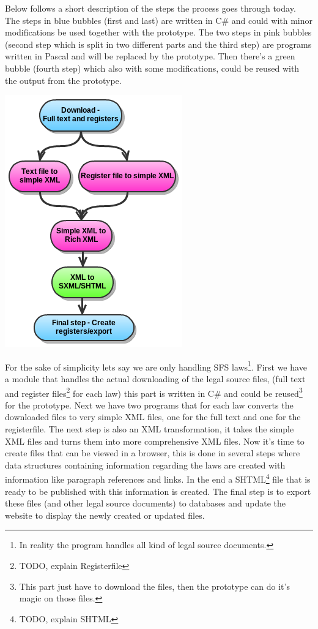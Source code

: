 \documentclass[a4paper,11pt]{kth-mag}
\begin{document}
Below follows a short description of the steps the process goes through today. The steps in blue bubbles (first and last) are written in C\# and could with minor modifications be used together with the prototype. The two steps in pink bubbles (second step which is split in two different parts and the third step) are programs written in Pascal and will be replaced by the prototype. Then there's a green bubble (fourth step) which also with some modifications, could be reused with the output from the prototype.   
\begin{center}
\includegraphics[scale=0.6]{imgs/oldSystemChart.png}
\end{center}
For the sake of simplicity lets say we are only handling SFS laws\footnote{In reality the program handles all kind of legal source documents.}. First we have a module that handles the actual downloading of the legal source files, (full text and register files\footnote{TODO, explain Registerfile} for each law) this part is written in C\# and could be reused\footnote{This part just have to download the files, then the prototype can do it's magic on those files.} for the prototype. Next we have two programs that for each law converts the downloaded files to very simple XML files, one for the full text and one for the registerfile. The next step is also an XML transformation, it takes the simple XML files and turns them into more comprehensive XML files. Now it's time to create files that can be viewed in a browser, this is done in several steps where data structures containing information regarding the laws are created with information like paragraph references and links. In the end a SHTML\footnote{TODO, explain SHTML} file that is ready to be published with this information is created. The final step is to export these files (and other legal source documents) to databases and update the website to display the newly created or updated files. 
\end{document}
